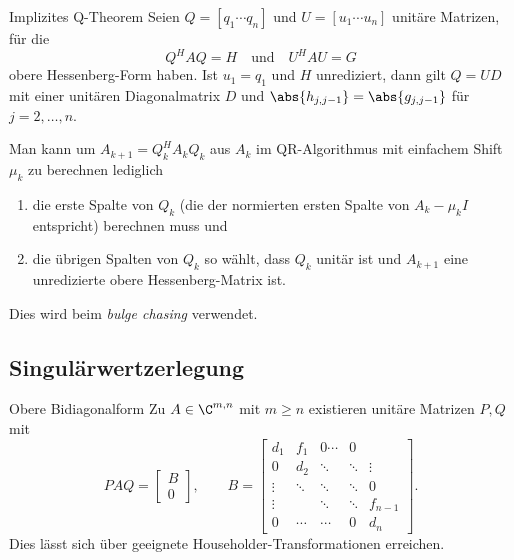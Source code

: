 \begin{karte}{Implizites Q-Theorem}
    Seien \( Q = [q_1 \cdots q_n] \) und \(U = [u_1 \cdots u_n]\) 
    unitäre Matrizen, für die 
    \[ Q^H A Q = H \quad \text{und} \quad U^H A U = G \] 
    obere Hessenberg-Form haben. 
    Ist \( u_1 = q_1 \) und \(H\) unrediziert, dann gilt 
    \( Q = UD \) mit einer unitären Diagonalmatrix \(D\) und 
    \( \abs{h_{j,j-1}} = \abs{g_{j,j-1}} \) für \( j= 2,\ldots, n \).

    Man kann um \( A_{k+1} = Q_k^H A_k Q_k \) aus \(A_k\) 
    im QR-Algorithmus mit einfachem Shift \(\mu_k\) zu berechnen 
    lediglich 
    \begin{enumerate}
        \item die erste Spalte von \( Q_k \) (die der normierten ersten Spalte von \(A_k - \mu_k I\) entspricht) 
        berechnen muss und 
        \item die übrigen Spalten von \( Q_k \) so wählt, dass \(Q_k\) unitär ist und \( A_{k+1} \) eine unredizierte obere Hessenberg-Matrix ist.
    \end{enumerate}
    Dies wird beim \textit{bulge chasing} verwendet.
\end{karte}

\subsection{Singulärwertzerlegung}

\begin{karte}{Obere Bidiagonalform}
    Zu \( A\in \C^{m,n} \) mit \( m\geq n \) existieren unitäre 
    Matrizen \( P, Q \) mit 
    \[ PAQ = \left[ \begin{matrix}
        B \\ 0
    \end{matrix} \right], \qquad B = \left[ \begin{matrix}
        d_1 & f_1 & 0 \cdots & 0 \\
        0 & d_2 & \ddots & \ddots & \vdots \\
        \vdots & \ddots & \ddots & \ddots & 0 \\
        \vdots & & \ddots & \ddots & f_{n-1} \\
        0 & \cdots & \cdots & 0 & d_n
    \end{matrix} \right]. \]
    Dies lässt sich über geeignete Householder-Transformationen erreichen.
\end{karte}

